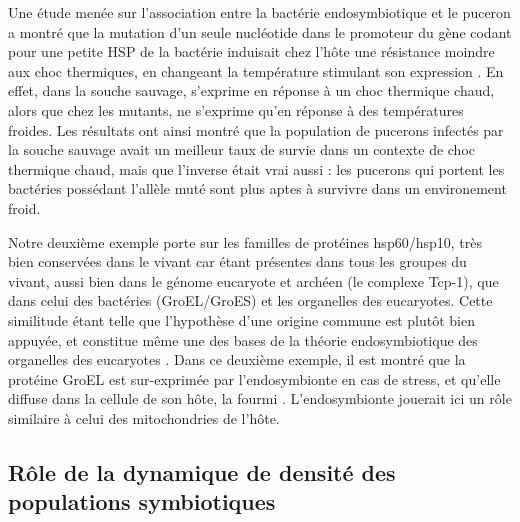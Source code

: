 Une étude menée sur l'association entre la bactérie endosymbiotique  et le puceron  a montré que la mutation d'un seule nucléotide dans le promoteur du gène  codant pour une petite HSP de la bactérie induisait chez l'hôte une résistance moindre aux choc thermiques, en changeant la température stimulant son expression \cite{dunbar2007}.
En effet, dans la souche sauvage,  s'exprime en réponse à un choc thermique chaud, alors que chez les mutants,  ne s'exprime qu'en réponse à des températures froides.
Les résultats ont ainsi montré que la population de pucerons infectés par la souche sauvage avait un meilleur taux de survie dans un contexte de choc thermique chaud, mais que l'inverse était vrai aussi : les pucerons qui portent les bactéries possédant l'allèle muté sont plus aptes à survivre dans un environement froid.

Notre deuxième exemple porte sur les familles de protéines hsp60/hsp10, très bien conservées dans le vivant car étant présentes dans tous les groupes du vivant, aussi bien dans le génome eucaryote et archéen (le complexe Tcp-1), que dans celui des bactéries (GroEL/GroES) et les organelles des eucaryotes.
Cette similitude étant telle que l'hypothèse d'une origine commune est plutôt bien appuyée, et constitue même une des bases de la théorie endosymbiotique des organelles des eucaryotes \cite{gupta1995}.
Dans ce deuxième exemple, il est montré que la protéine GroEL est sur-exprimée par l'endosymbionte  en cas de stress, et qu'elle diffuse dans la cellule de son hôte, la fourmi  \cite{stoll2009}.
L'endosymbionte jouerait ici un rôle similaire à celui des mitochondries de l'hôte.

\subsection{Rôle de la dynamique de densité des populations symbiotiques}


